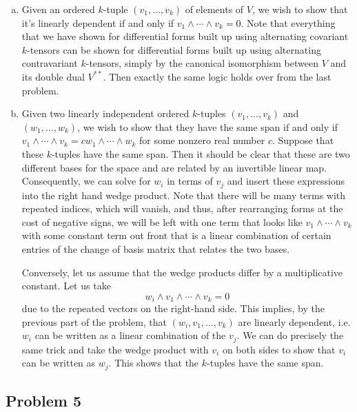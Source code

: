 \documentclass{../../mathnotes}
\begin{document}
\begin{enumerate}[(a)]
    \item 
        Given an ordered $k$-tuple $(v_1,\ldots,v_k)$ of elements of $V$, we wish to show that it's linearly dependent if and
        only if $v_1\wedge\cdots\wedge v_k=0$. Note that everything that we have shown for differential forms built up using
        alternating covariant $k$-tensors can be shown for differential forms built up using alternating contravariant $k$-tensors,
        simply by the canonical isomorphism between $V$ and its double dual $V^{**}$. Then exactly the same logic holds over from
        the last problem.
    \item
        Given two linearly independent ordered $k$-tuples $(v_1,\ldots,v_k)$ and $(w_1,\ldots,w_k)$, we wish to show that they
        have the same span if and only if $v_1\wedge\cdots\wedge v_k=cw_1\wedge\cdots\wedge w_k$ for some nonzero real number $c$.
        Suppose that these $k$-tuples have the same span. Then it should be clear that these are two different bases for the space
        and are related by an invertible linear map. Consequently, we can solve for $w_i$ in terms of $v_j$ and insert these expressions
        into the right hand wedge product. Note that there will be many terms with repeated indices, which will vanish, and thus, after
        rearranging forms at the cost of negative signs, we will be left with one term that looks like $v_1\wedge\cdots\wedge v_k$
        with some constant term out front that is a linear combination of certain entries of the change of basis matrix that relates
        the two bases.

        Conversely, let us assume that the wedge products differ by a multiplicative constant. Let us take
        \[w_i\wedge v_1\wedge\cdots\wedge v_k=0\]
        due to the repeated vectors on the right-hand side. This implies, by the previous part of the problem, that $(w_i,v_1,\ldots, v_k)$
        are linearly dependent, i.e. $w_i$ can be written as a linear combination of the $v_j$. We can do precisely the same trick and take the
        wedge product with $v_i$ on both sides to show that $v_i$ can be written as $w_j$. This shows that the $k$-tuples have the same
        span.
\end{enumerate}

\subsection*{Problem 5}
\end{document}
